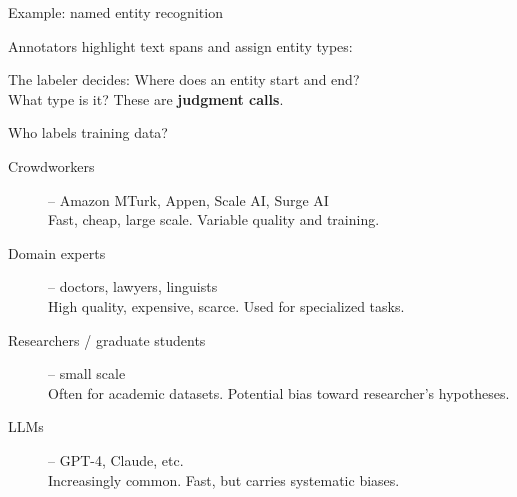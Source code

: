\documentclass[aspectratio=169,11pt]{beamer}
\begin{document}
\begin{frame}{Example: named entity recognition}

Annotators highlight text spans and assign entity types:

\vspace{0.5em}

\begin{center}
\small
{}
\end{center}

\vspace{0.5em}

The labeler decides: Where does an entity start and end?\\
What type is it? These are \textbf{judgment calls}.
\end{frame}

\begin{frame}{Who labels training data?}

\begin{description}
  \item[Crowdworkers] -- Amazon MTurk, Appen, Scale AI, Surge AI\\
    \small Fast, cheap, large scale. Variable quality and training.
  \normalsize
  \item[Domain experts] -- doctors, lawyers, linguists\\
    \small High quality, expensive, scarce. Used for specialized tasks.
  \normalsize
  \item[Researchers / graduate students] -- small scale\\
    \small Often for academic datasets. Potential bias toward researcher's hypotheses.
  \normalsize
  \item[LLMs] -- GPT-4, Claude, etc.\\
    \small Increasingly common. Fast, but carries systematic biases.
\end{description}
\end{frame}
\end{document}
